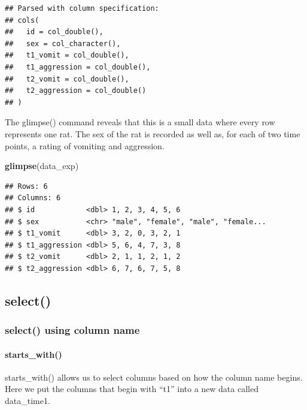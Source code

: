 \documentclass[
]{krantz}
\makeatletter
\newenvironment{Shaded}{\begin{snugshade}}{\end{snugshade}}
\newcommand{\KeywordTok}[1]{\textcolor[rgb]{0.27,0.27,0.27}{\textbf{#1}}}
\newcommand{\NormalTok}[1]{#1}
\newcommand{\OperatorTok}[1]{\textcolor[rgb]{0.43,0.43,0.43}{\textbf{#1}}}
\newcommand{\StringTok}[1]{\textcolor[rgb]{0.5,0.5,0.5}{#1}}
\newenvironment{kframe}{%
\medskip{}
\setlength{\fboxsep}{.8em}
 \def\at@end@of@kframe{}%
 \ifinner\ifhmode%
  \def\at@end@of@kframe{\end{minipage}}%
  \begin{minipage}{\columnwidth}%
 \fi\fi%
 \def\FrameCommand##1{\hskip\@totalleftmargin \hskip-\fboxsep
 \colorbox{shadecolor}{##1}\hskip-\fboxsep
     \hskip-\linewidth \hskip-\@totalleftmargin \hskip\columnwidth}%
 \MakeFramed {\advance\hsize-\width
   \@totalleftmargin\z@ \linewidth\hsize
   \@setminipage}}%
 {\par\unskip\endMakeFramed%
 \at@end@of@kframe}
\renewenvironment{Shaded}{\begin{kframe}}{\end{kframe}}
\makeatother
\begin{document}
\begin{verbatim}
## Parsed with column specification:
## cols(
##   id = col_double(),
##   sex = col_character(),
##   t1_vomit = col_double(),
##   t1_aggression = col_double(),
##   t2_vomit = col_double(),
##   t2_aggression = col_double()
## )
\end{verbatim}

The glimpse() command reveals that this is a small data where every row represents one rat. The sex of the rat is recorded as well as, for each of two time points, a rating of vomiting and aggression.

\begin{Shaded}
\begin{Highlighting}[]
\KeywordTok{glimpse}\NormalTok{(data_exp)}
\end{Highlighting}
\end{Shaded}

\begin{verbatim}
## Rows: 6
## Columns: 6
## $ id            <dbl> 1, 2, 3, 4, 5, 6
## $ sex           <chr> "male", "female", "male", "female...
## $ t1_vomit      <dbl> 3, 2, 0, 3, 2, 1
## $ t1_aggression <dbl> 5, 6, 4, 7, 3, 8
## $ t2_vomit      <dbl> 2, 1, 1, 2, 1, 2
## $ t2_aggression <dbl> 6, 7, 6, 7, 5, 8
\end{verbatim}

\hypertarget{select-1}{%
\subsection{select()}\label{select-1}}

\hypertarget{select-using-column-name}{%
\subsubsection{select() using column name}\label{select-using-column-name}}

\hypertarget{starts_with}{%
\paragraph{starts\_with()}\label{starts_with}}

starts\_with() allows us to select columns based on how the column name begins. Here we put the columns that begin with ``t1'' into a new data called data\_time1.

\begin{Shaded}
\end{Shaded}
\end{document}
